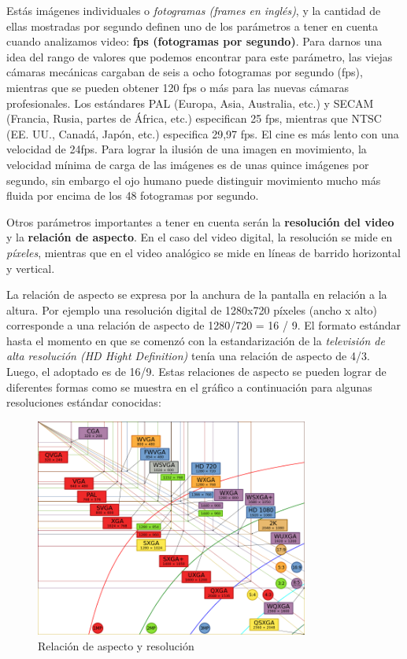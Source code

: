 \documentclass[12pt]{article}
\begin{document}
Estás imágenes individuales o {\it fotogramas (frames en inglés)}, y la 
cantidad de ellas mostradas por segundo definen uno de los parámetros a 
tener en cuenta cuando analizamos video: {\bf fps (fotogramas por segundo)}. 
Para darnos una idea del rango de valores que podemos encontrar para 
este parámetro, las viejas cámaras mecánicas cargaban de seis a ocho 
fotogramas por segundo (fps), mientras que se pueden obtener 120 fps o más para 
las nuevas cámaras profesionales. Los estándares PAL (Europa, Asia, Australia, 
etc.) y SECAM (Francia, Rusia, partes de África, etc.) especifican 25 fps, 
mientras que NTSC (EE. UU., Canadá, Japón, etc.) especifica 29,97 fps. El cine 
es más lento con una velocidad de 24fps. Para lograr la ilusión de una 
imagen en movimiento, la velocidad mínima de carga de las imágenes es de unas 
quince imágenes por segundo, sin embargo el ojo humano puede distinguir 
movimiento mucho más fluida por encima de los 48 fotogramas por segundo.

Otros parámetros importantes a tener en cuenta serán la {\bf resolución del video} y
la {\bf relación de aspecto}. En el caso del video digital, la resolución 
se mide en {\it píxeles}, mientras que en el video analógico se mide en 
líneas de barrido horizontal y vertical. 

La relación de aspecto se expresa por la anchura de la pantalla en relación a la altura. 
Por ejemplo una resolución digital de 1280x720 píxeles (ancho x alto) corresponde 
a una relación de aspecto de 1280/720 = 16 / 9. 
El formato estándar hasta el momento en que se comenzó con la estandarización de 
la {\it televisión de alta resolución (HD Hight Definition)} tenía una relación de 
aspecto de 4/3. Luego, el adoptado es de 16/9. Estas relaciones de aspecto se 
pueden lograr de diferentes formas como se muestra en el gráfico a continuación
para algunas resoluciones estándar conocidas:

\begin{figure}[h]
\centering
\includegraphics[width=0.8\textwidth]{resol.png}
\renewcommand{\figurename}{Fig.}
\caption{Relación de aspecto y resolución}
\label{contexto:figura}
\end{figure}
\end{document}
